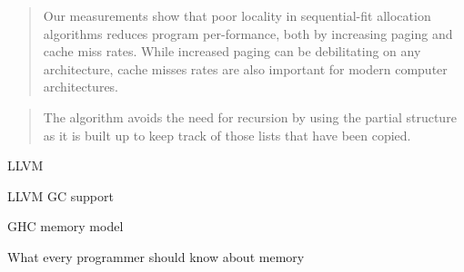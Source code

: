 \documentclass[a4paper,oneside]{memoir}
\begin{document}
\blockquote{Our measurements show that poor locality in sequential-fit
allocation algorithms reduces program per-formance, both by increasing paging
and cache miss rates. While increased paging can be debilitating on any
architecture, cache misses rates are also important for modern computer
architectures. \cite{Grunwald:1993}}

\blockquote{The algorithm avoids the need for recursion by using the partial
structure as it is built up to keep track of those lists that have been copied.}
\cite{Cheney:1970}

LLVM\cite{LLVM}

LLVM GC support\cite{LLVMGC}

GHC memory model \cite{GHCCommentary}

What every programmer should know about memory \cite{Drepper}




%
\end{document}
